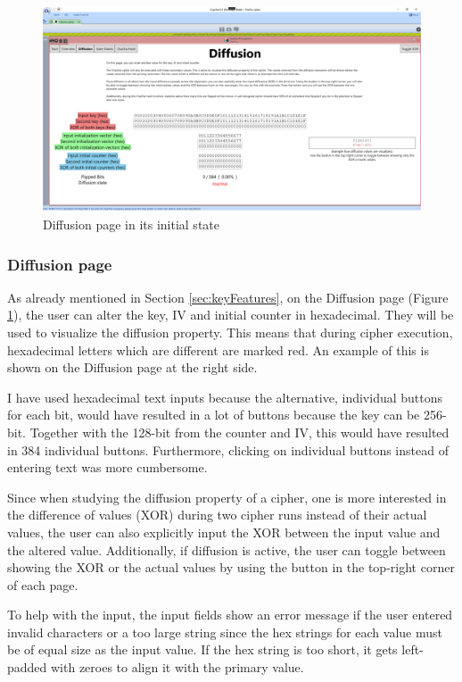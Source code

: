 \begin{figure}
\centering
\includegraphics[width=\textwidth]{figures/ct2/all-pages/3-diffusion.png}
\caption{Diffusion page in its initial state}
\label{fig:diffusionpage}
\end{figure}

\subsubsection{Diffusion page}

As already mentioned in Section \ref{sec:keyFeatures}, on the Diffusion page (Figure \ref{fig:diffusionpage}), the user can alter the key, IV and initial counter in hexadecimal. They will be used to visualize the diffusion property. This means that during cipher execution, hexadecimal letters which are different are marked red. An example of this is shown on the Diffusion page at the right side.

I have used hexadecimal text inputs because the alternative, individual buttons for each bit, would have resulted in a lot of buttons because the key can be 256-bit. Together with the 128-bit from the counter and IV, this would have resulted in 384 individual buttons. Furthermore, clicking on individual buttons instead of entering text was more cumbersome.

Since when studying the diffusion property of a cipher, one is more interested in the difference of values (XOR) during two cipher runs instead of their actual values, the user can also explicitly input the XOR between the input value and the altered value. Additionally, if diffusion is active, the user can toggle between showing the XOR or the actual values by using the button in the top-right corner of each page.

To help with the input, the input fields show an error message if the user entered invalid characters or a too large string since the hex strings for each value must be of equal size as the input value. If the hex string is too short, it gets left-padded with zeroes to align it with the primary value.


